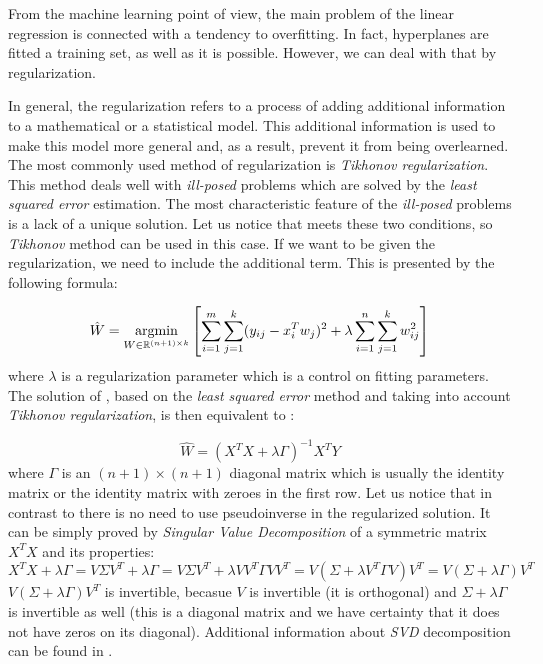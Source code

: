 From the machine learning point of view, the main problem of the linear regression is connected with a tendency to overfitting. In fact, hyperplanes are fitted a training set, as well as it is possible. However, we can deal with that by regularization.

In general, the regularization refers to a process of adding additional information to a mathematical or a statistical model. This additional information is used to make this model more general and, as a result, prevent it from being overlearned. The most commonly used method of regularization is \textit{Tikhonov regularization}. This method deals well with \textit{ill-posed} problems which are solved by the \textit{least squared error} estimation. The most characteristic feature of the \textit{ill-posed} problems is a lack of a unique solution. Let us notice that  meets these two conditions, so \textit{Tikhonov} method can be used in this case. If we want  to be given the regularization, we need to include the additional term. This is presented by the following formula:

\begin{equation}\label{eq:LR2}
    \hat{W} = \operatorname*{argmin}_{W \in \mathbb{R}^{(n+1) \times k}}\left[\sum\limits_{i=1}^{m}\sum\limits_{j=1}^{k}(y_{ij}-x^T_iw_j)^2 + \lambda\sum\limits_{i=1}^{n}\sum\limits_{j=1}^{k}w_{ij}^2\right]
\end{equation}
where $\lambda$ is a regularization parameter which is a control on fitting parameters. The solution of , based on the \textit{least squared error} method and taking into account \textit{Tikhonov regularization}, is then equivalent to \cite{Tikh}:

\begin{equation}\label{eq:LR3}
    \hat{W} = (X^TX+\lambda\Gamma)^{-1}X^TY
\end{equation}
where $\Gamma$ is an $(n+1)\times(n+1)$ diagonal matrix which is usually the identity matrix or the identity matrix with zeroes in the first row. Let us notice that in contrast to  there is no need to use pseudoinverse in the regularized solution. It can be simply proved by \textit{Singular Value Decomposition} of a symmetric matrix $X^TX$ and its properties:
\begin{equation}\label{eq:inv_proof}
    X^TX + \lambda\Gamma=V\Sigma{V^T} + \lambda\Gamma = V\Sigma{V^T} + \lambda{V}V^T\Gamma{V}V^T = V(\Sigma + \lambda{V^T}\Gamma{V})V^T = V(\Sigma + \lambda\Gamma)V^T 
\end{equation}
$V(\Sigma + \lambda\Gamma)V^T$ is invertible, becasue $V$ is invertible (it is orthogonal) and $\Sigma +\lambda\Gamma$ is invertible as well (this is a diagonal matrix and we have certainty that it does not have zeros on its diagonal). Additional information about \textit{SVD} decomposition can be found in .

